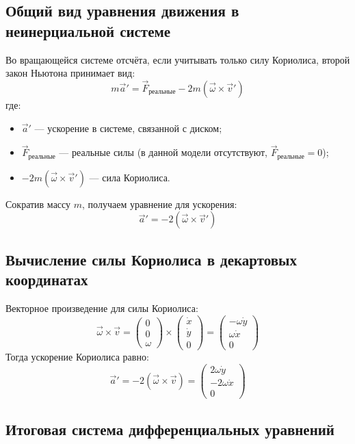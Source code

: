\documentclass[a4paper,12pt]{article}
\begin{document}
\subsection{Общий вид уравнения движения в неинерциальной системе}

Во вращающейся системе отсчёта, если учитывать только силу Кориолиса, второй закон Ньютона принимает вид:
\[
m \vec{a}' = \vec{F}_\text{реальные} - 2m (\vec{\omega} \times \vec{v}')
\]
где:
\begin{itemize}
    \item $\vec{a}'$ — ускорение в системе, связанной с диском;
    \item $\vec{F}_\text{реальные}$ — реальные силы (в данной модели отсутствуют, $\vec{F}_\text{реальные} = 0$);
    \item $-2m (\vec{\omega} \times \vec{v}')$ — сила Кориолиса.
\end{itemize}
Сократив массу $m$, получаем уравнение для ускорения:
\[
\vec{a}' = -2 (\vec{\omega} \times \vec{v}')
\]

\subsection{Вычисление силы Кориолиса в декартовых координатах}

Векторное произведение для силы Кориолиса:
\[
\vec{\omega} \times \vec{v} =
\begin{pmatrix}
0 \\ 0 \\ \omega
\end{pmatrix}
\times
\begin{pmatrix}
\dot{x} \\ \dot{y} \\ 0
\end{pmatrix}
=
\begin{pmatrix}
-\omega \dot{y} \\
\omega \dot{x} \\
0
\end{pmatrix}
\]
Тогда ускорение Кориолиса равно:
\[
\vec{a}' = -2(\vec{\omega} \times \vec{v}) =
\begin{pmatrix}
2\omega \dot{y} \\
-2\omega \dot{x} \\
0
\end{pmatrix}
\]

\subsection{Итоговая система дифференциальных уравнений}
\end{document}

